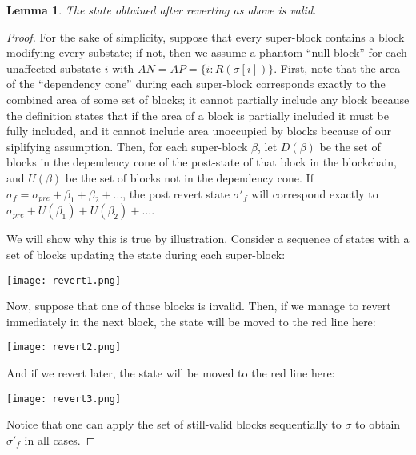 \documentclass[11pt,a4paper]{report}
\theoremstyle{plain}
\newtheorem{lem}[thm]{Lemma}
\theoremstyle{definition}
\theoremstyle{remark}
\begin{document}
\begin{lem}
The state obtained after reverting as above is valid.
\end{lem}

\begin{proof}
For the sake of simplicity, suppose that every super-block contains a block modifying every substate; if not, then we assume a phantom ``null block'' for each unaffected substate $i$ with $AN = AP = \{i: R(\sigma[i])\}$. First, note that the area of the ``dependency cone'' during each super-block corresponds exactly to the combined area of some set of blocks; it cannot partially include any block because the definition states that if the area of a block is partially included it must be fully included, and it cannot include area unoccupied by blocks because of our siplifying assumption. Then, for each super-block $\beta$, let $D(\beta)$ be the set of blocks in the dependency cone of the post-state of that block in the blockchain, and $U(\beta)$ be the set of blocks not in the dependency cone. If $\sigma_f = \sigma_{pre} + \beta_1 + \beta_2 + ...$, the post revert state $\sigma'_f$ will correspond exactly to $\sigma_{pre} + U(\beta_1) + U(\beta_2) + ...$.

We will show why this is true by illustration. Consider a sequence of states with a set of blocks updating the state during each super-block:

\begin{center}
\texttt{[image: revert1.png]}
\end{center}

Now, suppose that one of those blocks is invalid. Then, if we manage to revert immediately in the next block, the state will be moved to the red line here:

\begin{center}
\texttt{[image: revert2.png]}
\end{center}

And if we revert later, the state will be moved to the red line here:

\begin{center}
\texttt{[image: revert3.png]}
\end{center}

Notice that one can apply the set of still-valid blocks sequentially to $\sigma$ to obtain $\sigma'_f$ in all cases.
\end{proof}
\end{document}
